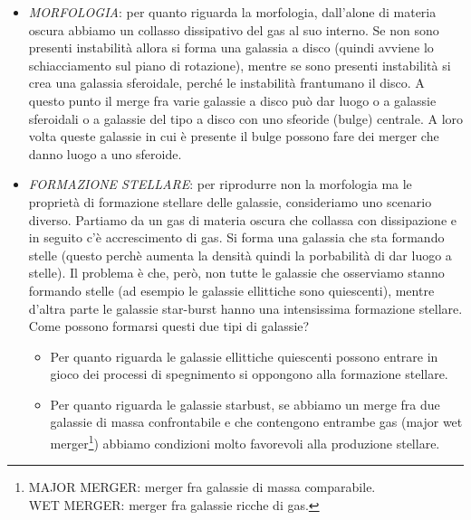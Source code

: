 \begin{itemize}
    \item \emph{MORFOLOGIA}: per quanto riguarda la morfologia, dall'alone di materia oscura abbiamo un collasso dissipativo del gas al suo interno. Se non sono presenti instabilità allora si forma una galassia a disco (quindi avviene lo schiacciamento sul piano di rotazione), mentre se sono presenti instabilità si crea una galassia sferoidale, perché le instabilità frantumano il disco. A questo punto il merge fra varie galassie a disco può dar luogo o a galassie sferoidali o a galassie del tipo a disco con uno sfeoride (bulge) centrale. A loro volta queste galassie in cui è presente il bulge possono fare dei merger che danno luogo a uno sferoide.
    \item \emph{FORMAZIONE STELLARE}: per riprodurre non la morfologia ma le proprietà di formazione stellare delle galassie, consideriamo uno scenario diverso. Partiamo da un gas di materia oscura che collassa con dissipazione e in seguito c’è accrescimento di gas. Si forma una galassia che sta formando stelle (questo perchè aumenta la densità quindi la porbabilità di dar luogo a stelle). Il problema è che, però, non tutte le galassie che osserviamo stanno formando stelle (ad esempio le galassie ellittiche sono quiescenti), mentre d’altra parte le galassie star-burst hanno una intensissima formazione stellare. Come possono formarsi questi due tipi di galassie?
    \begin{itemize}
        \item Per quanto riguarda le galassie ellittiche quiescenti possono entrare in gioco dei processi di spegnimento si oppongono alla formazione stellare.
        \item Per quanto riguarda le galassie starbust, se abbiamo un merge fra due galassie di massa confrontabile e che contengono entrambe gas (major wet merger\footnote{
        MAJOR MERGER: merger fra galassie di massa comparabile. \\
        WET MERGER: merger fra galassie ricche di gas.
        }) abbiamo condizioni molto favorevoli alla produzione stellare.
    \end{itemize}
\end{itemize}